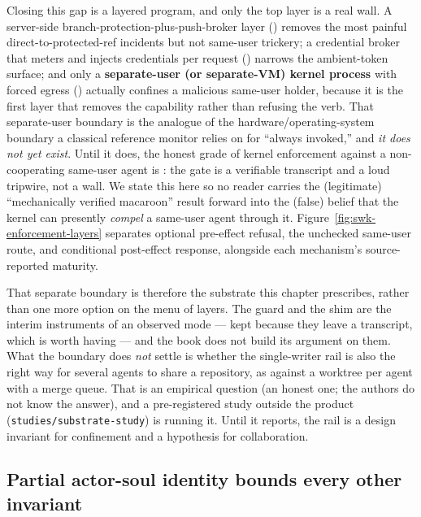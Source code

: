 \documentclass[11pt,a4paper]{article}
\theoremstyle{definition}
\theoremstyle{remark}
\begin{document}
Closing this gap is a layered program, and only the top layer is a real wall. A
server-side branch-protection-plus-push-broker layer (\Designed) removes the most
painful direct-to-protected-ref incidents but not same-user trickery; a credential
broker that meters and injects credentials per request (\Vision) narrows the
ambient-token surface; and only a \textbf{separate-user (or separate-VM) kernel
process} with forced egress (\Vision) actually confines a malicious same-user
holder, because it is the first layer that removes the capability rather than
refusing the verb. That separate-user boundary is the analogue of the
hardware/operating-system boundary a classical reference monitor relies on for
``always invoked,'' and \emph{it does not yet exist}. Until it does, the honest
grade of kernel enforcement against a non-cooperating same-user agent is
\NotGuar: the gate is a verifiable transcript and a loud tripwire, not a wall. We
state this here so no reader carries the (legitimate) ``mechanically verified
macaroon'' result forward into the (false) belief that the kernel can presently
\emph{compel} a same-user agent through it. Figure~\ref{fig:swk-enforcement-layers}
separates optional pre-effect refusal, the unchecked same-user route, and
conditional post-effect response, alongside each mechanism's source-reported maturity.


\FloatBarrier

That separate boundary is therefore the substrate this chapter prescribes,
rather than one more option on the menu of layers. The guard and the shim are
the interim instruments of an observed mode --- kept because they leave a
transcript, which is worth having --- and the book does not build its
argument on them. What the boundary does \emph{not} settle is whether the
single-writer rail is also the right way for several agents to share a
repository, as against a worktree per agent with a merge queue. That is an
empirical question (an honest one; the authors do not know the answer), and a
pre-registered study outside the product (\texttt{studies/substrate-study})
is running it. Until it reports, the rail is a design invariant for
confinement and a hypothesis for collaboration.

\subsection{Partial actor-soul identity bounds every other invariant}
\end{document}
